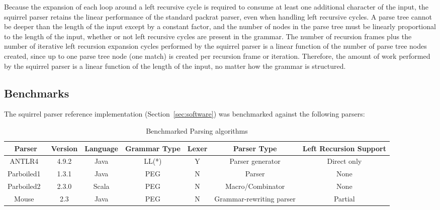 \documentclass[manuscript]{acmart}
\begin{document}
Because the expansion of each loop around a left recursive cycle is required to consume at least one additional character of the input, the squirrel parser retains the linear performance of the standard packrat parser, even when handling left recursive cycles. A parse tree cannot be deeper than the length of the input except by a constant factor, and the number of nodes in the parse tree must be linearly proportional to the length of the input, whether or not left recursive cycles are present in the grammar. The number of recursion frames plus the number of iterative left recursion expansion cycles performed by the squirrel parser is a linear function of the number of parse tree nodes created, since up to one parse tree node (one match) is created per recursion frame or iteration. Therefore, the amount of work performed by the squirrel parser is a linear function of the length of the input, no matter how the grammar is structured.

\subsection{Benchmarks}

The squirrel parser reference implementation (Section~\ref{sec:software}) was benchmarked against the following parsers:

\begin{table}[h!]
\centering
\begin{tabular}{c c c c c c c} 
    \hline
    Parser & Version & Language & Grammar Type & Lexer & Parser Type & Left Recursion Support \\
    \hline
    ANTLR4~\cite{parr2014,antlr4} & 4.9.2 & Java & LL(*) & Y & Parser generator & Direct only \\
    Parboiled1~\cite{parboiled1} & 1.3.1 & Java & PEG & N & Parser & None \\
    Parboiled2~\cite{parboiled2} & 2.3.0 & Scala & PEG & N & Macro/Combinator & None \\
    Mouse~\cite{mouse} & 2.3 & Java & PEG & N & Grammar-rewriting parser & Partial \\
    \hline
\end{tabular}
\caption{Benchmarked Parsing algorithms}
\label{table:1}
\end{table}

\end{document}
